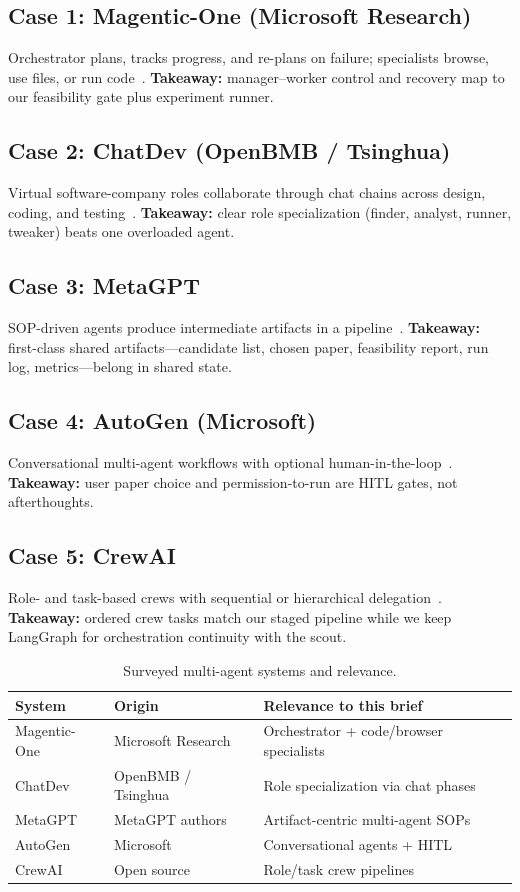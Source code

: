 \documentclass[11pt,a4paper]{article}
\begin{document}
\subsection{Case 1: Magentic-One (Microsoft Research)}
Orchestrator plans, tracks progress, and re-plans on failure; specialists
browse, use files, or run code~\cite{magenticone}.
\textbf{Takeaway:} manager--worker control and recovery map to our
feasibility gate plus experiment runner.

\subsection{Case 2: ChatDev (OpenBMB / Tsinghua)}
Virtual software-company roles collaborate through chat chains across design,
coding, and testing~\cite{chatdev}.
\textbf{Takeaway:} clear role specialization (finder, analyst, runner,
tweaker) beats one overloaded agent.

\subsection{Case 3: MetaGPT}
SOP-driven agents produce intermediate artifacts in a pipeline~\cite{metagpt}.
\textbf{Takeaway:} first-class shared artifacts---candidate list, chosen
paper, feasibility report, run log, metrics---belong in shared state.

\subsection{Case 4: AutoGen (Microsoft)}
Conversational multi-agent workflows with optional human-in-the-loop~\cite{autogen}.
\textbf{Takeaway:} user paper choice and permission-to-run are HITL gates,
not afterthoughts.

\subsection{Case 5: CrewAI}
Role- and task-based crews with sequential or hierarchical
delegation~\cite{crewai}.
\textbf{Takeaway:} ordered crew tasks match our staged pipeline while we keep
LangGraph for orchestration continuity with the scout.

\begin{table}[ht]
\centering
\caption{Surveyed multi-agent systems and relevance.}
\label{tab:cases}
\begin{tabular}{@{}llp{5.4cm}@{}}
\toprule
\textbf{System} & \textbf{Origin} & \textbf{Relevance to this brief} \\
\midrule
Magentic-One & Microsoft Research & Orchestrator + code/browser specialists \\
ChatDev & OpenBMB / Tsinghua & Role specialization via chat phases \\
MetaGPT & MetaGPT authors & Artifact-centric multi-agent SOPs \\
AutoGen & Microsoft & Conversational agents + HITL \\
CrewAI & Open source & Role/task crew pipelines \\
\bottomrule
\end{tabular}
\end{table}
\end{document}
